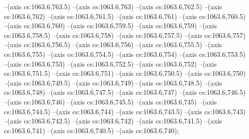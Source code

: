 --(axis cs:1063.6,763.5)
--(axis cs:1063.6,763)
--(axis cs:1063.6,762.5)
--(axis cs:1063.6,762)
--(axis cs:1063.6,761.5)
--(axis cs:1063.6,761)
--(axis cs:1063.6,760.5)
--(axis cs:1063.6,760)
--(axis cs:1063.6,759.5)
--(axis cs:1063.6,759)
--(axis cs:1063.6,758.5)
--(axis cs:1063.6,758)
--(axis cs:1063.6,757.5)
--(axis cs:1063.6,757)
--(axis cs:1063.6,756.5)
--(axis cs:1063.6,756)
--(axis cs:1063.6,755.5)
--(axis cs:1063.6,755)
--(axis cs:1063.6,754.5)
--(axis cs:1063.6,754)
--(axis cs:1063.6,753.5)
--(axis cs:1063.6,753)
--(axis cs:1063.6,752.5)
--(axis cs:1063.6,752)
--(axis cs:1063.6,751.5)
--(axis cs:1063.6,751)
--(axis cs:1063.6,750.5)
--(axis cs:1063.6,750)
--(axis cs:1063.6,749.5)
--(axis cs:1063.6,749)
--(axis cs:1063.6,748.5)
--(axis cs:1063.6,748)
--(axis cs:1063.6,747.5)
--(axis cs:1063.6,747)
--(axis cs:1063.6,746.5)
--(axis cs:1063.6,746)
--(axis cs:1063.6,745.5)
--(axis cs:1063.6,745)
--(axis cs:1063.6,744.5)
--(axis cs:1063.6,744)
--(axis cs:1063.6,743.5)
--(axis cs:1063.6,743)
--(axis cs:1063.6,742.5)
--(axis cs:1063.6,742)
--(axis cs:1063.6,741.5)
--(axis cs:1063.6,741)
--(axis cs:1063.6,740.5)
--(axis cs:1063.6,740);
